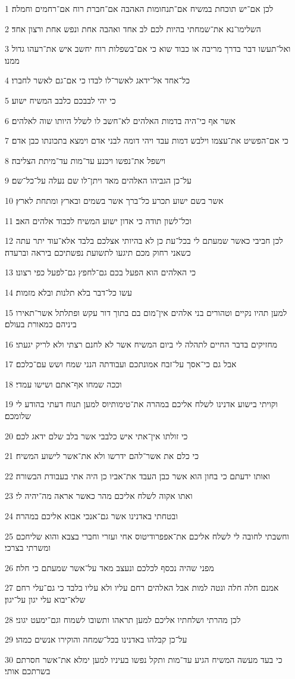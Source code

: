 \par 1 לכן אם־יש תוכחת במשיח אם־תנחומות האהבה אם־חברת רוח אם־רחמים וחמלה׃
\par 2 השלימו־נא את־שמחתי בהיות לכם לב אחד ואהבה אחת ונפש אחת ורצון אחד׃
\par 3 ואל־תעשו דבר בדרך מריבה או כבוד שוא כי אם־בשפלות רוח יחשב איש את־רעהו גדול ממנו׃
\par 4 כל־אחד אל־ידאג לאשר־לו לבדו כי אם־גם לאשר לחברו׃
\par 5 כי יהי לבבכם כלבב המשיח ישוע׃
\par 6 אשר אף כי־היה בדמות האלהים לא־חשב לו לשלל היותו שוה לאלהים׃
\par 7 כי אם־הפשיט את־עצמו וילבש דמות עבד ויהי דומה לבני אדם וימצא בתכונתו כבן אדם׃
\par 8 וישפל את־נפשו ויכנע עד־מות עד־מיתת הצליבה׃
\par 9 על־כן הגביהו האלהים מאד ויתן־לו שם נעלה על־כל־שם׃
\par 10 אשר בשם ישוע תכרע כל־ברך אשר בשמים ובארץ ומתחת לארץ׃
\par 11 וכל־לשון תודה כי אדון ישוע המשיח לכבוד אלהים האב׃
\par 12 לכן חביבי כאשר שמעתם לי בכל־עת כן לא בהיותי אצלכם בלבד אלא־עוד יתר עתה כשאני רחוק מכם תיגעו לתשועת נפשתיכם ביראה וברעדה׃
\par 13 כי האלהים הוא הפעל בכם גם־לחפץ גם־לפעל כפי רצונו׃
\par 14 עשו כל־דבר בלא תלנות ובלא מזמות׃
\par 15 למען תהיו נקיים וטהורים בני אלהים אין־מום בם בתוך דור עקש ופתלתל אשר־תאירו ביניהם כמאורת בעולם׃
\par 16 מחזיקים בדבר החיים לתהלה לי ביום המשיח אשר לא לחנם רצתי ולא לריק יגעתי׃
\par 17 אבל גם כי־אסך על־זבח אמונתכם ועבודתה הנני שמח ושש עם־כלכם׃
\par 18 וככה שמחו אף־אתם ושישו עמדי׃
\par 19 וקויתי בישוע אדנינו לשלח אליכם במהרה את־טימותיוס למען תנוח דעתי בהודע לי שלומכם׃
\par 20 כי זולתו אין־אתי איש כלבבי אשר בלב שלם ידאג לכם׃
\par 21 כי כלם את אשר־להם ידרשו ולא את־אשר לישוע המשיח׃
\par 22 ואותו ידעתם כי בחון הוא אשר כבן העבד את־אביו כן היה אתי בעבודת הבשורה׃
\par 23 ואתו אקוה לשלח אליכם מהר כאשר אראה מה־יהיה לי׃
\par 24 ובטחתי באדנינו אשר גם־אנכי אבוא אליכם במהרה׃
\par 25 וחשבתי לחובה לי לשלח אליכם את־אפפרודיטוס אחי ועזרי וחברי בצבא והוא שליחכם ומשרתי בצרכי׃
\par 26 מפני שהיה נכסף לכלכם ונעצב מאד על־אשר שמעתם כי חלה׃
\par 27 אמנם חלה חלה ונטה למות אבל האלהים רחם עליו ולא עליו בלבד כי גם־עלי רחם שלא־יבוא עלי יגון על־יגון׃
\par 28 לכן מהרתי ושלחתיו אליכם למען תראהו ותשובו לשמוח וגם־ימעט יגוני׃
\par 29 על־כן קבלהו באדנינו בכל־שמחה והוקירו אנשים כמהו׃
\par 30 כי בעד מעשה המשיח הגיע עד־מות ותקל נפשו בעיניו למען ימלא את־אשר חסרתם בשרתכם אותי׃

